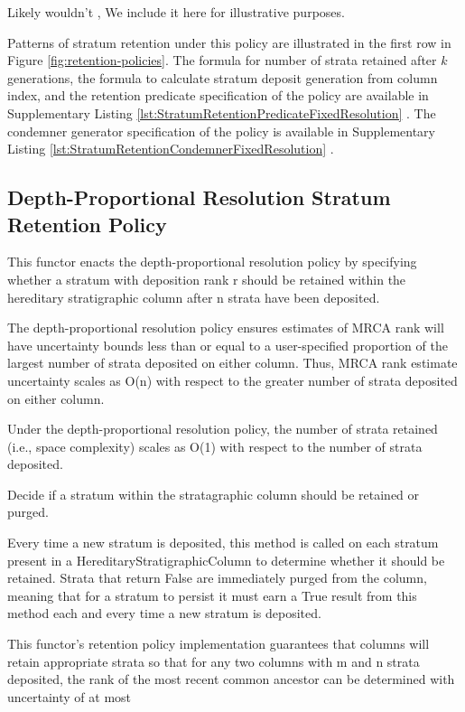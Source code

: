 Likely wouldn't ,
We include it here for illustrative purposes.

Patterns of stratum retention under this policy are illustrated in the first row in Figure \ref{fig:retention-policies}.
The formula for number of strata retained after $k$ generations, the formula to calculate stratum deposit generation from column index, and the retention predicate specification of the policy are available in Supplementary Listing \ref{lst:StratumRetentionPredicateFixedResolution} \citep{moreno2022hstratconceptsupplement}.
The condemner generator specification of the policy is available in Supplementary Listing \ref{lst:StratumRetentionCondemnerFixedResolution} \citep{moreno2022hstratconceptsupplement}.

\subsection{Depth-Proportional Resolution Stratum Retention Policy}

This functor enacts the depth-proportional resolution policy by specifying
whether a stratum with deposition rank r should be retained within the
hereditary stratigraphic column after n strata have been deposited.

The depth-proportional resolution policy ensures estimates of MRCA rank will
have uncertainty bounds less than or equal to a user-specified
proportion of the largest number of strata deposited on either column.
Thus, MRCA rank estimate uncertainty scales as O(n) with respect to the
greater number of strata deposited on either column.

Under the depth-proportional resolution policy, the number of strata
retained (i.e., space complexity) scales as O(1) with respect to the number
of strata deposited.

Decide if a stratum within the stratagraphic column should be
retained or purged.

Every time a new stratum is deposited, this method is called on each
stratum present in a HereditaryStratigraphicColumn to determine whether
it should be retained. Strata that return False are immediately purged
from the column, meaning that for a stratum to persist it must earn a
True result from this method each and every time a new stratum is
deposited.

This functor's retention policy implementation guarantees that columns
will retain appropriate strata so that for any two columns with m and n
strata deposited, the rank of the most recent common ancestor can be
determined with uncertainty of at most

